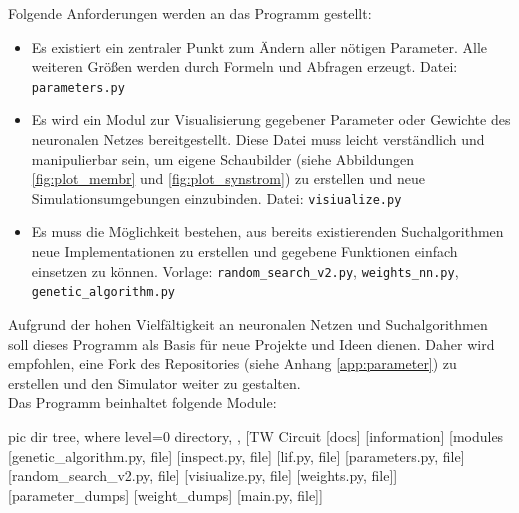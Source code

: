 	Folgende Anforderungen werden an das Programm gestellt:
	\begin{itemize}
		\item Es existiert ein zentraler Punkt zum Ändern aller nötigen Parameter. Alle weiteren Größen werden durch Formeln und Abfragen erzeugt.
		\subitem Datei: \texttt{parameters.py}
		\item Es wird ein Modul zur Visualisierung gegebener Parameter oder Gewichte des neuronalen Netzes bereitgestellt. Diese Datei muss leicht verständlich und manipulierbar sein, um eigene Schaubilder (siehe Abbildungen \ref{fig:plot_membr} und \ref{fig:plot_synstrom}) zu erstellen und neue Simulationsumgebungen einzubinden.
		\subitem Datei: \texttt{visiualize.py}
		\item Es muss die Möglichkeit bestehen, aus bereits existierenden Suchalgorithmen neue Implementationen zu erstellen und gegebene Funktionen einfach einsetzen zu können.
		\subitem Vorlage: \texttt{random\_search\_v2.py}, \texttt{weights\_nn.py}, \texttt{genetic\_algorithm.py}
	\end{itemize}
	Aufgrund der hohen Vielfältigkeit an neuronalen Netzen und Suchalgorithmen soll dieses Programm als Basis für neue Projekte und Ideen dienen. Daher wird empfohlen, eine Fork des Repositories (siehe Anhang \ref{app:parameter}) zu erstellen und den Simulator weiter zu gestalten.\\
	Das Programm beinhaltet folgende Module:\\
	\begin{minipage}{0.35\textwidth}
		\vspace{0.3cm}
		\begin{forest}
			pic dir tree,
			where level=0{}{%
				directory,
			},
			[TW Circuit
				[docs]
				[information]
				[modules
					[genetic\_algorithm.py, file]
					[inspect.py, file]
					[lif.py, file]
					[parameters.py, file]
					[random\_search\_v2.py, file]
					[visiualize.py, file]
					[weights.py, file]]
				[parameter\_dumps]
				[weight\_dumps]
				[main.py, file]]
		\end{forest}
	\end{minipage}
